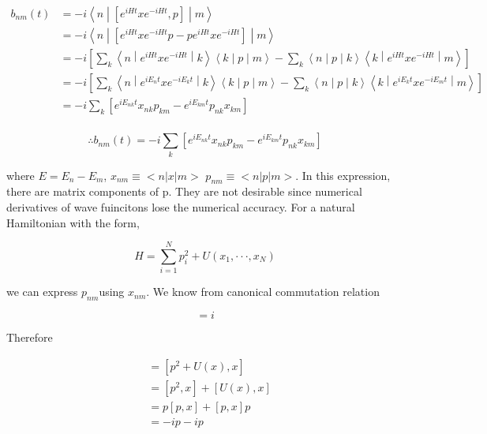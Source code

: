 \documentclass[12pt, letterpaper]{article}
\newcommand*{\1}{\hspace{1pt}}
\begin{document}
        \begin{align*}
            b_{nm}(t) &= -i\left\langle n \middle|\left[e^{iHt}xe^{-iHt},p\right]\middle| m\right\rangle \\
            &= -i\left\langle n \middle|\left[e^{iHt}xe^{-iHt}p - pe^{iHt}xe^{-iHt}\right]\middle| m\right\rangle \\
            &= -i\left[\sum_{k}\left\langle n \middle|e^{iHt}xe^{-iHt} \middle| k\right\rangle\left\langle k \middle| p \middle| m \right\rangle - \sum_{k}\left\langle n \middle| p \middle| k \right\rangle\left\langle k \middle|e^{iHt}xe^{-iHt} \middle | m\right\rangle\right] \\
            &= -i\left[\sum_{k}\left\langle n \middle|e^{iE_{n}t}xe^{-iE_{k}t} \middle| k\right\rangle\left\langle k \middle| p \middle| m \right\rangle - \sum_{k}\left\langle n \middle| p \middle| k \right\rangle\left\langle k \middle|e^{iE_{k}t}xe^{-iE_{m}t} \middle | m\right\rangle\right] \\
            &= -i \sum_{k}\left[e^{iE_{nk}t}x_{nk}p_{km} - e^{iE_{km}t}p_{nk}x_{km} \right] \\
        \end{align*}

        \begin{equation}
            \therefore b_{nm}(t) = -i \sum_{k}\left[e^{iE_{nk}t}x_{nk}p_{km} - e^{iE_{km}t}p_{nk}x_{km} \right]
        \end{equation}

        where $E = E_{n} - E_{m}$, $x_{nm} \equiv <n|x|m>$ $p_{nm} \equiv <n|p|m>$. In this expression, there are matrix components of p. They are not desirable since
        numerical derivatives of wave fuincitons lose the numerical accuracy. For a natural Hamiltonian with the form, 

        \begin{equation}
            H = \sum_{i=1} ^{N} p_{i}^{2} + U(x_{1}, \cdot \cdot \cdot ,  x_{N})
        \end{equation}

        we can express $p_{nm}$using $x_{nm}$. We know from canonical commutation relation 

        \begin{equation}
            [x,p] = i \tag{$\hbar=1$}
        \end{equation}

        Therefore

        \begin{align*}
            [H,x] &= [p^{2} + U(x) , x] \\
            &= [p^{2},x] + [U(x), x] \\
            &= p[p,x] + [p,x]p  \\
            &= -ip -ip  \\
        \end{align*}
\end{document}
